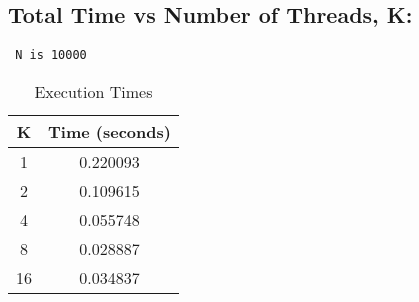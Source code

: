 \documentclass{article}
\begin{document}
\subsection{Total Time vs Number of Threads, K:}
\texttt{
    N is 10000\\
}
\begin{table}[H]
    \centering
    \begin{tabular}{|c|c|}
    \hline
    \textbf{K} & \textbf{Time (seconds)}\\
    \hline
    1 & 0.220093 \\
    \hline
    2 & 0.109615 \\
    \hline
    4 & 0.055748 \\
    \hline
    8 & 0.028887 \\
    \hline
    16 & 0.034837 \\
    \hline
    \end{tabular}
    \caption{Execution Times}
    \label{tab:execution_times}
    \end{table}

\newpage
\end{document}
